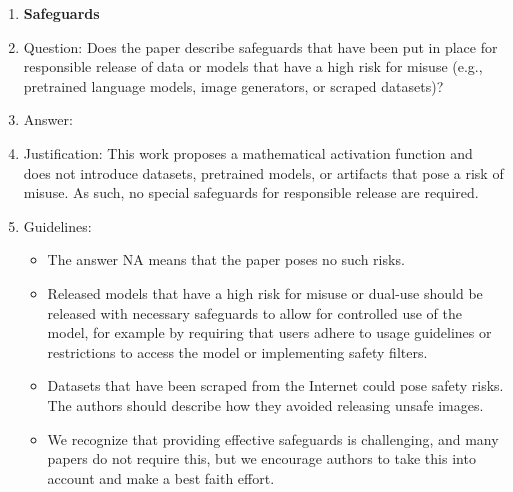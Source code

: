 \documentclass{article}
\begin{document}
\begin{enumerate}
\item {\bf Safeguards}
    \item[] Question: Does the paper describe safeguards that have been put in place for responsible release of data or models that have a high risk for misuse (e.g., pretrained language models, image generators, or scraped datasets)?
    \item[] Answer: \answerNA{} %
    \item[] Justification: This work proposes a mathematical activation function and does not introduce datasets, pretrained models, or artifacts that pose a risk of misuse. As such, no special safeguards for responsible release are required.
    \item[] Guidelines:
    \begin{itemize}
        \item The answer NA means that the paper poses no such risks.
        \item Released models that have a high risk for misuse or dual-use should be released with necessary safeguards to allow for controlled use of the model, for example by requiring that users adhere to usage guidelines or restrictions to access the model or implementing safety filters. 
        \item Datasets that have been scraped from the Internet could pose safety risks. The authors should describe how they avoided releasing unsafe images.
        \item We recognize that providing effective safeguards is challenging, and many papers do not require this, but we encourage authors to take this into account and make a best faith effort.
    \end{itemize}


\end{enumerate}
\end{document}
